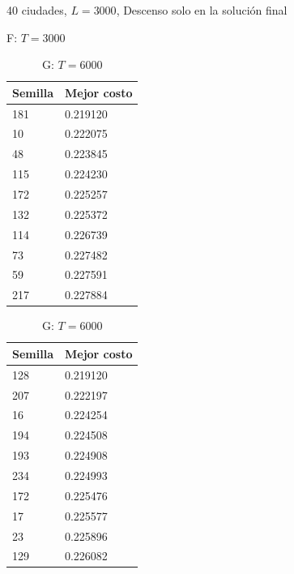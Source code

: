 \documentclass{article}
\begin{document}
  \begin{table}[!htb]
    \caption{40 ciudades, 
             $L=3000$, 
             Descenso solo en la solución final}
    \begin{minipage}{.5\linewidth}
      \caption{F: $T= 3000$}
      \centering
      \begin{tabular}{l|l}
        Semilla & Mejor costo \\
        \hline
        181     & 0.219120 \\
        \hline
        10      & 0.222075 \\
        \hline
        48      & 0.223845 \\
        \hline
        115     & 0.224230 \\
        \hline
        172     & 0.225257 \\
        \hline
        132     & 0.225372 \\
        \hline
        114     & 0.226739 \\
        \hline
        73      & 0.227482 \\
        \hline
        59      & 0.227591 \\
        \hline
        217     & 0.227884 \\
      \end{tabular}
    \end{minipage}%
    \begin{minipage}{.5\linewidth}
      \centering
      \caption{G: $T=6000$}
      \begin{tabular}{l|l}
        Semilla & Mejor costo \\
        \hline
        128     & 0.219120 \\
        \hline
        207     & 0.222197 \\
        \hline
        16      & 0.224254 \\
        \hline
        194     & 0.224508 \\
        \hline
        193     & 0.224908 \\
        \hline
        234     & 0.224993 \\
        \hline
        172     & 0.225476 \\
        \hline
        17      & 0.225577 \\
        \hline
        23      & 0.225896 \\
        \hline
        129     & 0.226082 \\
      \end{tabular}
    \end{minipage}

\end{table}
\end{document}
